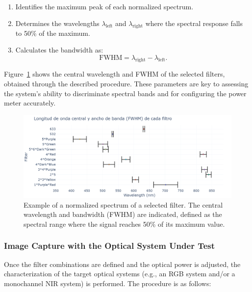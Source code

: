 \begin{enumerate}
    \item Identifies the maximum peak of each normalized spectrum.
    \item Determines the wavelengths \(\lambda_{\text{left}}\) and \(\lambda_{\text{right}}\) where the spectral response falls to 50\% of the maximum.
    \item Calculates the bandwidth as:
    \[
    \text{FWHM} = \lambda_{\text{right}} - \lambda_{\text{left}}.
    \]
\end{enumerate}

Figure~\ref{fig:bandwidth_central} shows the central wavelength and FWHM of the selected filters, obtained through the described procedure. These parameters are key to assessing the system’s ability to discriminate spectral bands and for configuring the power meter accurately.

\begin{figure}[htbp]
    \centering
    \includegraphics[trim=0mm 0mm 50mm 25mm, clip, width=1\textwidth]{Figures/C3/ancho de banda.png}
    \caption{Example of a normalized spectrum of a selected filter. The central wavelength and bandwidth (FWHM) are indicated, defined as the spectral range where the signal reaches 50\% of its maximum value.}
    \label{fig:bandwidth_central}
\end{figure}

\subsubsection{Image Capture with the Optical System Under Test}
\label{subsub:captura_sistemas_opticos}

Once the filter combinations are defined and the optical power is adjusted, the characterization of the target optical systems (e.g., an RGB system and/or a monochannel NIR system) is performed. The procedure is as follows:

